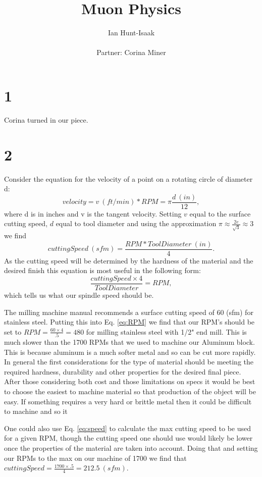 \documentclass[11pt,letterpaper]{article}
\title{Muon Physics}
\author{Ian Hunt-Isaak\\ \begin{small}
Partner: Corina Miner
\end{small}}
\begin{document}
\date{}
\maketitle
\section*{1}
Corina turned in our piece.
\section*{2} %
Consider the equation for the velocity of a point on a rotating circle of diameter d:
\begin{equation}
velocity = v\ (ft/min) * RPM = \pi \frac{d\ (in)}{12},
\end{equation}
where d is in inches and v is the tangent velocity.
Setting $v$ equal to the surface cutting speed, $d$ equal to tool diameter and using the approximation $\pi \approx \frac{2e}{\sqrt{3}} \approx 3$ we find
\begin{equation}
\label{eq:speed}
cuttingSpeed\ (sfm)= \frac{RPM*Tool Diameter\ (in)}{4}.
\end{equation}
As the cutting speed will be determined by the hardness of the material and the desired finish this equation is most useful in the following form:
\begin{equation}
\label{eq:RPM}
\frac{cuttingSpeed \times 4}{ToolDiameter} = RPM,
\end{equation}
which tells us what our spindle speed should be. 

The milling machine manual recommends a surface cutting speed of 60 (sfm) for stainless steel. Putting this into Eq. \ref{eq:RPM} we find that our RPM's should be set to $RPM = \frac{60 \times 4}{.5} = 480$ for milling stainless steel with 1/2" end mill. This is much slower than the 1700 RPMs that we used to machine our Aluminum block. This is because aluminum is a much softer metal and so can be cut more rapidly. In general the first considerations for the type of material should be meeting the required hardness, durability and other properties for the desired final piece. After those considering both cost and those limitations on specs it would be best to choose the easiest to machine material so that production of the object will be easy. If something requires a very hard or brittle metal then it could be difficult to machine and so it 

One could also use Eq. \ref{eq:speed} to calculate the max cutting speed to be used for a given RPM, though the cutting speed one should use would likely be lower once the properties of the material are taken into account. Doing that and setting our RPMs to the max on our machine of 1700 we find that $cuttingSpeed = \frac{1700 \times .5}{4} =212.5\ (sfm)$.
\end{document}
